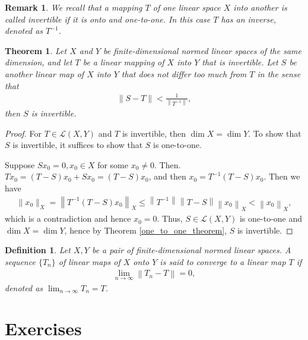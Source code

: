 \documentclass[11pt]{book}
\newtheorem{definition}{Definition}[section]
\newtheorem{theorem}{Theorem}[section]
\newtheorem{remark}{Remark}[section]
\theoremstyle{definition}
\numberwithin{equation}{chapter}
\begin{document}
\begin{remark}
We recall that a mapping $T$ of one linear space $X$ into another is called invertible if it is onto and one-to-one. In this case $T$ has an inverse, denoted as $T^{-1}$.
\end{remark}

\medskip

\begin{theorem}
Let $X$ and $Y$ be finite-dimensional normed linear spaces of the same dimension, and let $T$ be a linear mapping of $X$ into $Y$ that is invertible. Let $S$ be another linear map of $X$ into $Y$ that does not differ too much from $T$ in the sense that
\begin{align*}
    \|S - T\| < \frac{1}{\left\|T^{-1}\right\|},
\end{align*}
then $S$ is invertible.
\end{theorem}
\begin{proof}
For $T \in \mathscr{L}(X, Y)$ and $T$ is invertible, then $\dim X = \dim Y$. To show that $S$ is invertible, it suffices to show that $S$ is one-to-one.

Suppose $Sx_0 = 0, x_0 \in X$ for some $x_0 \neq 0$. Then. $Tx_0 = (T - S)x_0 + Sx_0 = (T - S)x_0$, and then $x_0 = T^{-1} (T - S)x_0$. Then we have
\begin{align*}
    \|x_0\|_X = \left\|T^{-1}(T - S)x_0\right\|_X \leq \left\|T^{-1}\right\| \left\|T - S\right\| \left\| x_0\right\|_X < \left\| x_0\right\|_X,
\end{align*}
which is a contradiction and hence $x_0 = 0$. Thus, $S \in \mathscr{L}(X,Y)$ is one-to-one and $\dim X = \dim Y$, hence by Theorem \ref{one_to_one_theorem}, $S$ is invertible.
\end{proof}

\medskip

\begin{definition}
Let $X, Y$ be a pair of finite-dimensional normed linear spaces. A sequence $\{T_n\}$ of linear maps of $X$ onto $Y$ is said to converge to a linear map $T$ if 
\begin{align*}
    \lim_{n \to \infty} \left\|T_n - T\right\| = 0,
\end{align*}
denoted as $\lim_{n \to \infty} T_n = T$.
\end{definition}










\chapter{Exercises}
\end{document}
